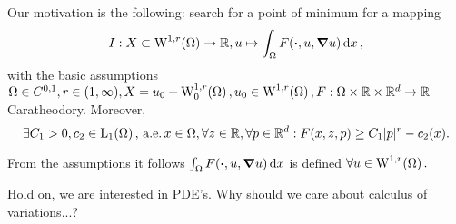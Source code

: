 \documentclass{article}
\begin{document}
Our motivation is the following: search for a point of minimum for a mapping
    \[
	    I: X \subset \WkpSet[1][r]{\Omega} \to \R, u \mapsto \int_{\Omega}F\qty(\vdot, u, \grad u)\dd{x},
    \]
    with the basic assumptions $\Omega \in C^{0,1}, r \in \qty(1, \infty), X = u_0 + \WkpzeroSet[1][r]{\Omega}, u_0 \in \WkpSet[1][r]{\Omega}, F: \Omega \times \R \times \R^d \to \R$ Caratheodory. Moreover,
    \[
	    \exists C_1 > 0, c_2 \in \LpSet[1]{\Omega}, \, \text{a.e.} \, x \in \Omega, \forall z \in \R, \forall p \in \R^d : F\qty(x,z,p)\geq C_1|p|^r - c_2(x).
    \]

    \begin{remark}
        From the assumptions it follows $\int_{\Omega}F\qty(\vdot, u, \grad u)\dd{x}$ is defined $\forall u \in \WkpSet[1][r]{\Omega}.$
    \end{remark}

Hold on, we are interested in PDE's. Why should we care about calculus of variations...?
\end{document}
